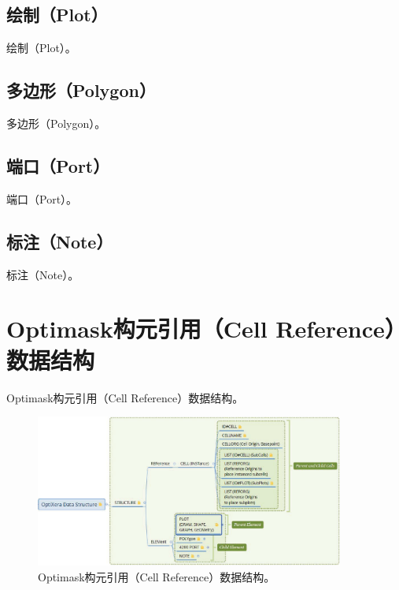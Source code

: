 \subsection{绘制（Plot）} \label{SectDataPlot} 
绘制（Plot）。

\subsection{多边形（Polygon）} \label{SectDataPoly} 
多边形（Polygon）。

\subsection{端口（Port）} \label{SectDataPort}
端口（Port）。

\subsection{标注（Note）} \label{SectDataNote} 
标注（Note）。

\section{Optimask构元引用（Cell Reference）数据结构} \label{SectDataRef}
Optimask构元引用（Cell Reference）数据结构。
\begin{figure}[htb!p] %
	\centering
	\includegraphics[width=4in]{./Layout/FigsData/RefCell.eps}
	\caption{Optimask构元引用（Cell Reference）数据结构。}
	\label{FigDataRef}
\end{figure}

